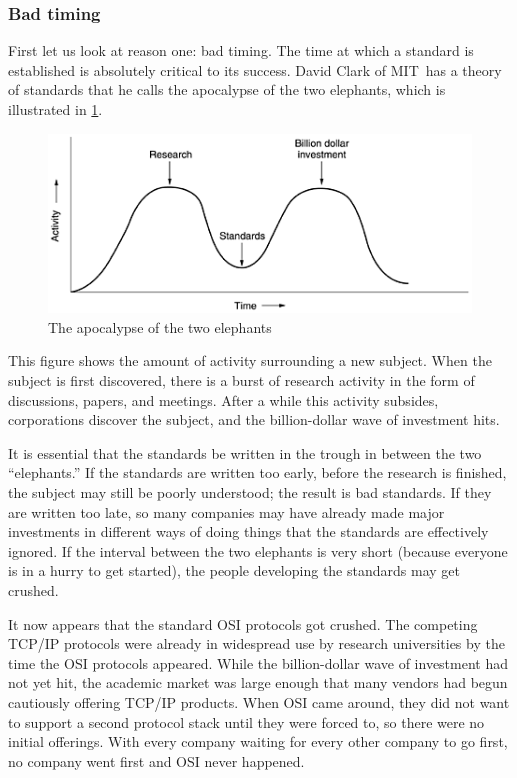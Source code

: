 \documentclass[b5paper,11pt]{memoir}
\begin{document}
\subsubsection{Bad timing}

First let us look at reason one: bad timing. The time at which a standard is established is absolutely critical to its success.
David Clark of MIT\ has a theory of standards that he calls the {apocalypse of the two elephants}, which is illustrated in \cref{fig:two-elephants}.

\begin{figure}
   \centering
   \includegraphics[width=\textwidth]{images/01fig23.png}
   \caption{The apocalypse of the two elephants}
   \label{fig:two-elephants}
\end{figure}


This figure shows the amount of activity surrounding a new subject. When
the subject is first discovered, there is a burst of research activity
in the form of discussions, papers, and meetings. After a while this
activity subsides, corporations discover the subject, and the
billion-dollar wave of investment hits.

It is essential that the standards be written in the trough in between
the two ``elephants.''
If the standards are written too early, before
the research is finished, the subject may still be poorly understood;
the result is bad standards. If they are written too late, so many
companies may have already made major investments in different ways of
doing things that the standards are effectively ignored. If the interval
between the two elephants is very short (because everyone is in a hurry
to get started), the people developing the standards may get crushed.

It now appears that the standard OSI protocols got crushed. The
competing TCP/IP protocols were already in widespread use by research
universities by the time the OSI protocols appeared. While the
billion-dollar wave of investment had not yet hit, the academic market
was large enough that many vendors had begun cautiously offering TCP/IP
products. When OSI came around, they did not want to support a second
protocol stack until they were forced to, so there were no initial
offerings. With every company waiting for every other company to go
first, no company went first and OSI never happened.
\end{document}
